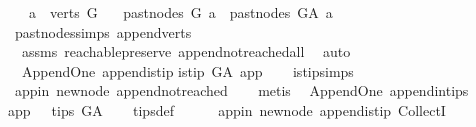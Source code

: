 \begin{isabellebody}
\ \ \ {\isachardoublequoteopen}a\ {\isasymin}\ verts\ G{\isachardoublequoteclose}\isanewline
\ \ \ {\isachardoublequoteopen}past{\isacharunderscore}{\kern0pt}nodes\ G\ a\ {\isacharequal}{\kern0pt}\ past{\isacharunderscore}{\kern0pt}nodes\ G{\isacharunderscore}{\kern0pt}A\ a{\isachardoublequoteclose}\isanewline
%
\isadelimproof
\ \ %
\endisadelimproof
%
\isatagproof
{}\isamarkupfalse%
\ past{\isacharunderscore}{\kern0pt}nodes{\isachardot}{\kern0pt}simps\ append{\isacharunderscore}{\kern0pt}verts\ \isamarkupfalse%
\ \isanewline
\ \ assms\ reachable{}{\isacharunderscore}{\kern0pt}preserve\ append{\isacharunderscore}{\kern0pt}not{\isacharunderscore}{\kern0pt}reached{\isacharunderscore}{\kern0pt}all\ \isamarkupfalse%
\ auto%
\endisatagproof
{\isafoldproof}%
%
\isadelimproof
\isanewline
%
\endisadelimproof
\isanewline
{}\isamarkupfalse%
\ {\isacharparenleft}{\kern0pt}\ Append{\isacharunderscore}{\kern0pt}One{\isacharparenright}{\kern0pt}\ append{\isacharunderscore}{\kern0pt}is{\isacharunderscore}{\kern0pt}tip{\isacharcolon}{\kern0pt}\isanewline
{\isachardoublequoteopen}is{\isacharunderscore}{\kern0pt}tip\ G{\isacharunderscore}{\kern0pt}A\ app{\isachardoublequoteclose}\isanewline
%
\isadelimproof
\ \ %
\endisadelimproof
%
\isatagproof
{}\isamarkupfalse%
\ is{\isacharunderscore}{\kern0pt}tip{\isachardot}{\kern0pt}simps\ \isanewline
\ \ \isamarkupfalse%
\ app{\isacharunderscore}{\kern0pt}in\ new{\isacharunderscore}{\kern0pt}node\ append{\isacharunderscore}{\kern0pt}not{\isacharunderscore}{\kern0pt}reached\isanewline
\ \ \isamarkupfalse%
\ metis%
\endisatagproof
{\isafoldproof}%
%
\isadelimproof
\isanewline
%
\endisadelimproof
\isanewline
{}\isamarkupfalse%
\ {\isacharparenleft}{\kern0pt}\ Append{\isacharunderscore}{\kern0pt}One{\isacharparenright}{\kern0pt}\ append{\isacharunderscore}{\kern0pt}in{\isacharunderscore}{\kern0pt}tips{\isacharcolon}{\kern0pt}\isanewline
{\isachardoublequoteopen}app\ \ {\isasymin}\ tips\ G{\isacharunderscore}{\kern0pt}A{\isachardoublequoteclose}\isanewline
%
\isadelimproof
\ \ %
\endisadelimproof
%
\isatagproof
{}\isamarkupfalse%
\ tips{\isacharunderscore}{\kern0pt}def\ \ \isanewline
\ \ \isamarkupfalse%
\ app{\isacharunderscore}{\kern0pt}in\ new{\isacharunderscore}{\kern0pt}node\ append{\isacharunderscore}{\kern0pt}is{\isacharunderscore}{\kern0pt}tip\ CollectI\isanewline
\ \ \isamarkupfalse%

\end{isabellebody}
